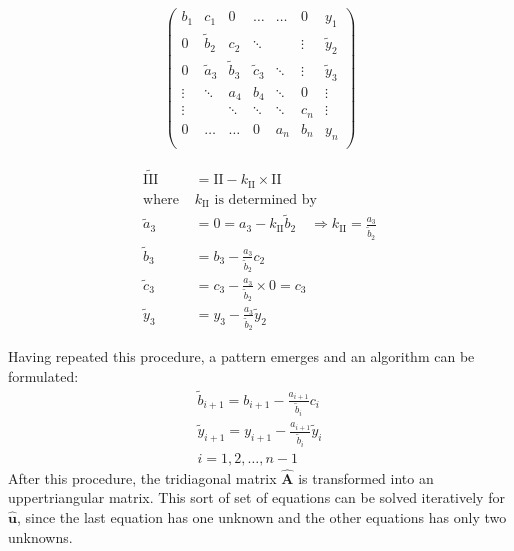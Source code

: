 \documentclass[11pt,a4paper,notitlepage]{article}
\begin{document}
\begin{minipage}{0.5\linewidth}
\begin{align*}
\left(\begin{matrix}
  b_1   & c_1    & 0      & \dots   & \dots  & 0       & y_1     \\
  0   & \tilde{b}_2    & c_2    & \ddots  &        & \vdots  & \tilde{y}_2  \\
  0     & \tilde{a}_3    & \tilde{b}_3    & \tilde{c}_3     & \ddots & \vdots  & \tilde{y}_3  \\
 \vdots & \ddots & a_4    & b_4     & \ddots & 0       & \vdots  \\
 \vdots &        & \ddots & \ddots  & \ddots & c_n     & \vdots  \\
  0     & \dots  & \dots  & 0       & a_{n}  & b_n     & y_{n}   \\
\end{matrix}\right)
\end{align*}
\end{minipage}
\begin{minipage}{0.5\linewidth}
	\begin{align*}
	\tilde{\text{III}} &= \text{II} - k_\text{II} \times \text{II}\\
	\text{where }&k_\text{II} \text{ is determined by}\\
\tilde{a}_3 &= 0 = a_3 - k_\text{II}\tilde{b}_2 \quad \Rightarrow k_\text{II} = \frac{a_3}{\tilde{b}_2}\\
	\tilde{b}_3 &= b_3 - \frac{a_3}{\tilde{b}_2} c_2 \\
	\tilde{c}_3 &= c_3 - \frac{a_3}{\tilde{b}_2} \times 0 = c_3 \\
	\tilde{y}_3 &= y_3 - \frac{a_3}{\tilde{b}_2} \tilde{y}_2
	\end{align*}
\end{minipage}
Having repeated this procedure, a pattern emerges and an algorithm can be formulated:
\begin{align*}
	\tilde{b}_{i+1} = b_{i+1} - \frac{a_{i+1}}{\tilde{b}_i} c_{i} \\
	\tilde{y}_{i+1} = y_{i+1} - \frac{a_{i+1}}{\tilde{b}_i} \tilde{y}_i \\
	i = 1,2,\dots, n-1
\end{align*}
After this procedure, the tridiagonal matrix $\mathbf{\hat{A}}$ is transformed into an uppertriangular matrix. This sort of set of equations can be solved iteratively for $\mathbf{\hat{u}}$, since the last equation has one unknown and the other equations has only two unknowns.  \\
\end{document}
